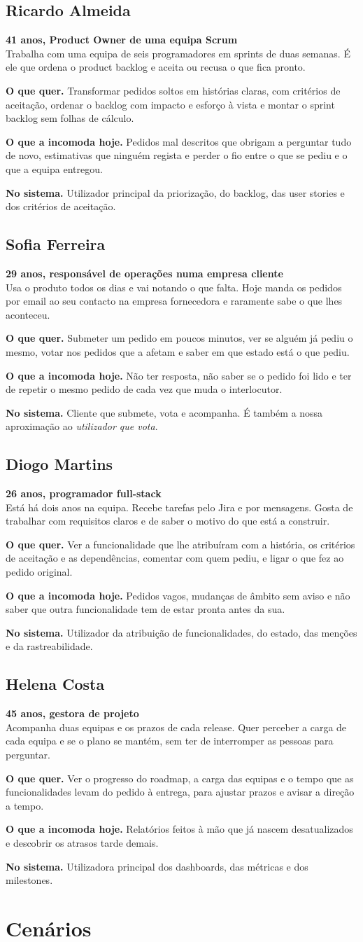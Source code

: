 \documentclass[12pt,a4paper]{article}
\newcommand{\persona}[6]{%
  \subsection{#1}
  \textbf{#2}\\
  #3

  \textbf{O que quer.} #4

  \textbf{O que a incomoda hoje.} #5

  \textbf{No sistema.} #6
}
\begin{document}
\persona{Ricardo Almeida}{41 anos, Product Owner de uma equipa Scrum}
{Trabalha com uma equipa de seis programadores em sprints de duas semanas. É ele que ordena o product backlog e aceita ou recusa o que fica pronto.}
{Transformar pedidos soltos em histórias claras, com critérios de aceitação, ordenar o backlog com impacto e esforço à vista e montar o sprint backlog sem folhas de cálculo.}
{Pedidos mal descritos que obrigam a perguntar tudo de novo, estimativas que ninguém regista e perder o fio entre o que se pediu e o que a equipa entregou.}
{Utilizador principal da priorização, do backlog, das user stories e dos critérios de aceitação.}

\persona{Sofia Ferreira}{29 anos, responsável de operações numa empresa cliente}
{Usa o produto todos os dias e vai notando o que falta. Hoje manda os pedidos por email ao seu contacto na empresa fornecedora e raramente sabe o que lhes aconteceu.}
{Submeter um pedido em poucos minutos, ver se alguém já pediu o mesmo, votar nos pedidos que a afetam e saber em que estado está o que pediu.}
{Não ter resposta, não saber se o pedido foi lido e ter de repetir o mesmo pedido de cada vez que muda o interlocutor.}
{Cliente que submete, vota e acompanha. É também a nossa aproximação ao \textit{utilizador que vota}.}

\persona{Diogo Martins}{26 anos, programador full-stack}
{Está há dois anos na equipa. Recebe tarefas pelo Jira e por mensagens. Gosta de trabalhar com requisitos claros e de saber o motivo do que está a construir.}
{Ver a funcionalidade que lhe atribuíram com a história, os critérios de aceitação e as dependências, comentar com quem pediu, e ligar o que fez ao pedido original.}
{Pedidos vagos, mudanças de âmbito sem aviso e não saber que outra funcionalidade tem de estar pronta antes da sua.}
{Utilizador da atribuição de funcionalidades, do estado, das menções e da rastreabilidade.}

\persona{Helena Costa}{45 anos, gestora de projeto}
{Acompanha duas equipas e os prazos de cada release. Quer perceber a carga de cada equipa e se o plano se mantém, sem ter de interromper as pessoas para perguntar.}
{Ver o progresso do roadmap, a carga das equipas e o tempo que as funcionalidades levam do pedido à entrega, para ajustar prazos e avisar a direção a tempo.}
{Relatórios feitos à mão que já nascem desatualizados e descobrir os atrasos tarde demais.}
{Utilizadora principal dos dashboards, das métricas e dos milestones.}

\section{Cenários}
\end{document}
